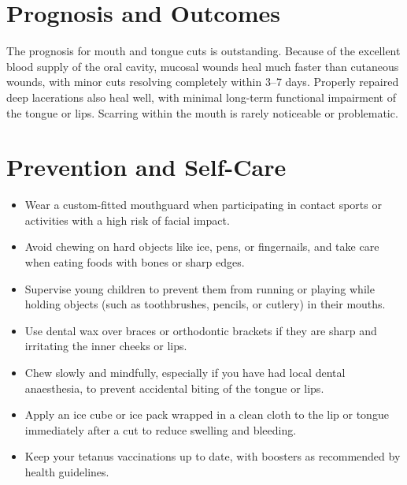 \section*{Prognosis and Outcomes}
The prognosis for mouth and tongue cuts is outstanding. Because of the excellent blood supply of the oral cavity, mucosal wounds heal much faster than cutaneous wounds, with minor cuts resolving completely within 3--7 days. Properly repaired deep lacerations also heal well, with minimal long-term functional impairment of the tongue or lips. Scarring within the mouth is rarely noticeable or problematic.

\section*{Prevention and Self-Care}
\begin{itemize}
    \item Wear a custom-fitted mouthguard when participating in contact sports or activities with a high risk of facial impact.
    \item Avoid chewing on hard objects like ice, pens, or fingernails, and take care when eating foods with bones or sharp edges.
    \item Supervise young children to prevent them from running or playing while holding objects (such as toothbrushes, pencils, or cutlery) in their mouths.
    \item Use dental wax over braces or orthodontic brackets if they are sharp and irritating the inner cheeks or lips.
    \item Chew slowly and mindfully, especially if you have had local dental anaesthesia, to prevent accidental biting of the tongue or lips.
    \item Apply an ice cube or ice pack wrapped in a clean cloth to the lip or tongue immediately after a cut to reduce swelling and bleeding.
    \item Keep your tetanus vaccinations up to date, with boosters as recommended by health guidelines.
\end{itemize}

